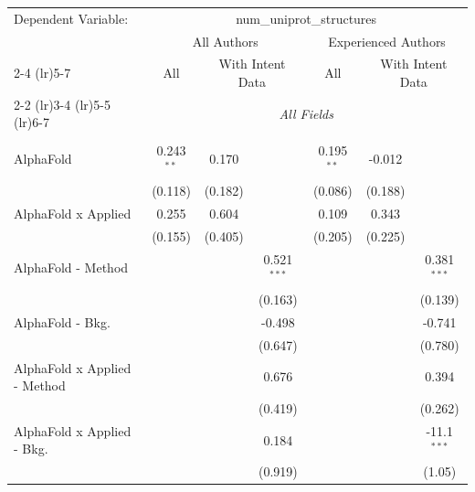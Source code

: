 \begingroup
\centering
\begin{tabular}{lcccccc}
   \tabularnewline \midrule \midrule
   Dependent Variable: & \multicolumn{6}{c}{num\_uniprot\_structures}\\
 & \multicolumn{3}{c}{All Authors} & \multicolumn{3}{c}{Experienced Authors} \\
\cmidrule(lr){2-4} \cmidrule(lr){5-7}
 & \multicolumn{1}{c}{All} & \multicolumn{2}{c}{With Intent Data} & \multicolumn{1}{c}{All} & \multicolumn{2}{c}{With Intent Data} \\
\cmidrule(lr){2-2} \cmidrule(lr){3-4} \cmidrule(lr){5-5} \cmidrule(lr){6-7}
 & \multicolumn{6}{c}{\textit{All Fields}} \\ \\
   AlphaFold                      & 0.243$^{**}$ & 0.170        &               & 0.195$^{**}$ & -0.012        &   \\   
                                  & (0.118)      & (0.182)      &               & (0.086)      & (0.188)       &   \\   
   AlphaFold x Applied            & 0.255        & 0.604        &               & 0.109        & 0.343         &   \\   
                                  & (0.155)      & (0.405)      &               & (0.205)      & (0.225)       &   \\   
   AlphaFold - Method             &              &              & 0.521$^{***}$ &              &               & 0.381$^{***}$\\   
                                  &              &              & (0.163)       &              &               & (0.139)\\   
   AlphaFold - Bkg.               &              &              & -0.498        &              &               & -0.741\\   
                                  &              &              & (0.647)       &              &               & (0.780)\\   
   AlphaFold x Applied - Method   &              &              & 0.676         &              &               & 0.394\\   
                                  &              &              & (0.419)       &              &               & (0.262)\\   
   AlphaFold x Applied - Bkg.     &              &              & 0.184         &              &               & -11.1$^{***}$\\   
                                  &              &              & (0.919)       &              &               & (1.05)\\   

\end{tabular}
